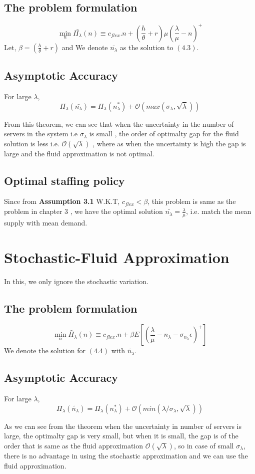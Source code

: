 \subsection{The problem formulation}
\begin{equation}
    \min_{n} \bar{{\Pi}_{\lambda}}({n}) \equiv c_{flex}.n+(\frac{h}{\theta}+r)\mu(\frac{\lambda}{\mu}-n)^{+}
\end{equation}
Let, $\beta=(\frac{h}{\theta}+r)$ and We denote $\bar{n_\lambda}$ as the solution to $(4.3)$.
\subsection{Asymptotic Accuracy}
\begin{theorem}
For large $\lambda$,
$$\Pi_\lambda(\bar{n_\lambda})=\Pi_\lambda(n_\lambda^{*})+\mathcal{O}(max(\sigma_\lambda,\sqrt{\lambda}))$$
\end{theorem}
From this theorem, we can see that when the uncertainty in the number of servers in the system i.e $\sigma_{\lambda}$ is small , the order of optimalty gap for the fluid solution is less i.e. $\mathcal{O}(\sqrt{\lambda})$ , where as when the uncertainty is high the gap is large and the fluid approximation is not optimal.
\subsection{Optimal staffing policy}
Since from \textbf{Assumption 3.1} W.K.T, $c_{flex}<\beta$, this problem is same as the problem in chapter 3 , we have the optimal solution $\bar{n_\lambda}=\frac{\lambda}{\mu}$, i.e. match the mean supply with mean demand.
\section{Stochastic-Fluid Approximation}
In this, we only ignore the stochastic variation.
\subsection{The problem formulation}
\begin{equation}
    \min_{n} \tilde{{\Pi}_{\lambda}}({n}) \equiv c_{flex}.n+\beta E[(\frac{\lambda}{\mu}-n_\lambda-\sigma_{n_\lambda}\epsilon)^{+}]
\end{equation}
We denote the solution for $(4.4)$ with $\tilde{n_\lambda}$.
\subsection{Asymptotic Accuracy}
\begin{theorem}
For large $\lambda$,
$$\Pi_\lambda(\tilde{n_\lambda})=\Pi_\lambda(n_\lambda^{*})+\mathcal{O}(min(\lambda/\sigma_\lambda,\sqrt{\lambda}))$$
\end{theorem}
As we can see from the theorem when the uncertainty in number of servers is large, the optimalty gap is very small, but when it is small, the gap is of the order that is same as the fluid approximation $\mathcal{O}(\sqrt{\lambda})$, so in case of small $\sigma_{\lambda}$, there is no advantage in using the stochastic approximation and we can use the fluid approximation.
